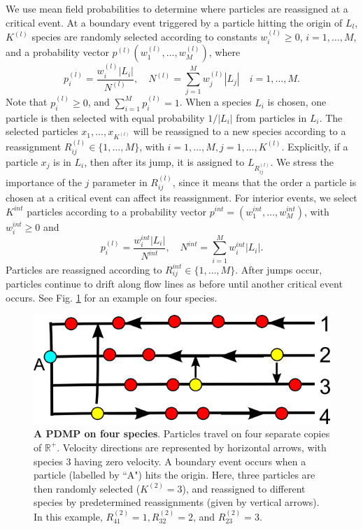We use mean field probabilities to determine where particles are reassigned at a critical event. At a boundary event triggered by a particle hitting the origin of $L_l$, $K^{(l)}$ species are randomly selected according to constants $w^{(l)}_i \ge 0$, $i = 1, \dots, M$, and  a probability vector $p^{(l)}(w^{(l)}_1, \dots,w^{(l)}_M)$, where 
\begin{equation}
p^{(l)}_i = \frac{w^{(l)}_i |L_i|}{ N^{(l)}},   \quad N^{(l)} = \sum_{j = 1}^M w^{(l)}_j |L_j| \quad i = 1, \dots, M.
\end{equation}
 Note that $p_i^{(l)}\ge0$, and $\sum_{i=1}^M p_i^{(l)}= 1$.
When a species $L_i$ is chosen, one particle is then selected with equal probability $1/|L_i|$ from particles in $L_i$.  The selected particles $x_{1}, \dots, x_{K^{(l)}}$ will be reassigned to a new species according to a reassignment $R^{(l)}_{ij}\in \{1, \dots, M\}$, with $i =1, \dots, M,j = 1, \dots, K^{(l)}$.  Explicitly, if a particle $x_j$ is in $L_i$, then after its jump, it is assigned to $L_{R^{(l)}_{ij}}$. We stress the importance of the $j$ parameter in $R_{ij}^{(l)}$, since it means that the order a particle is chosen at a critical event can affect its reassignment.  For interior events, we select $K^{int}$ particles according to a probability vector $p^{int} =  (w^{int}_1, \dots,w^{int}_M)$, with $w_i^{int} \ge 0$ and
\begin{equation}
p^{(l)}_i = \frac{w^{int}_i |L_i|}{ N^{int}},   \quad N^{int} = \sum_{i = 1}^M w^{int}_i |L_i|.
\end{equation}
 Particles are  reassigned according to $R^{int}_{ij}\in\{1, \dots, M\} $. After jumps occur, particles continue to drift along flow lines as before until another critical event occurs. See Fig. \ref{pdmppic} for an example on four species. 


\begin{figure}
\begin{centering}
\includegraphics[width=.5\textwidth]{gen_pdmppic.png}
\caption{\textbf{A PDMP on four species}.  Particles travel on four separate copies of $\mathbb{R}^+$.  Velocity directions are represented by horizontal arrows, with species 3 having zero velocity. A boundary event occurs when a particle (labelled by ``A") hits the origin.  Here, three particles  are then randomly selected ($K^{(2)} = 3$), and reassigned  to different species by predetermined reassignments (given by vertical arrows). In this example, $R_{41}^{(2)} = 1, R_{32}^{(2)} = 2$, and $R_{23}^{(2)} = 3$. }
\label{pdmppic}
\end{centering}

\end{figure}  





